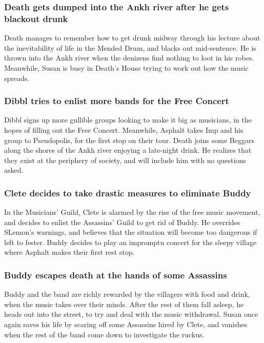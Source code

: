 \subsubsection{\Gls{Death} gets dumped into the Ankh river after he gets blackout drunk}
\Gls{Death} manages to remember how to get drunk midway through his lecture about the inevitability
of life in the Mended Drum, and blacks out mid-sentence. He is thrown into the Ankh river when the
denizens find nothing to loot in his robes. Meanwhile, \Gls{Susan} is busy in \Gls{Death}'s House
trying to work out how the music spreads.

\subsubsection{\Gls{Dibbl} tries to enlist more bands for the Free Concert}
\Gls{Dibbl} signs up more gullible groups looking to make it big as musicians, in the hopes of
filling out the Free Concert. Meanwhile, \Gls{Asphalt} takes \Gls{Imp} and his group to Pseudopolis,
for the first stop on their tour. \Gls{Death} joins some Beggars along the shores of the Ankh
river enjoying a late-night drink. He realizes that they exist at the periphery of society, and
will include him with no questions asked.

\subsubsection{\Gls{Clete} decides to take drastic measures to eliminate \Gls{Buddy}}
In the Musicians' Guild, \Gls{Clete} is alarmed by the rise of the free music movement, and decides
to enlist the Assassins' Guild to get rid of \Gls{Buddy}. He overrides \Gls{SLemon}'s warnings, and
believes that the situation will become too dangerous if left to fester. \Gls{Buddy} decides to
play an impromptu concert for the sleepy village where \Gls{Asphalt} makes their first rest stop.

\subsubsection{\Gls{Buddy} escapes death at the hands of some Assassins}
\Gls{Buddy} and the band are richly rewarded by the villagers with food and drink, when the music
takes over their minds. After the rest of them fall asleep, he heads out into the street, to try and
deal with the music withdrawal. \Gls{Susan} once again saves his life by scaring off some Assassins
hired by \Gls{Clete}, and vanishes when the rest of the band come down to investigate the ruckus.

